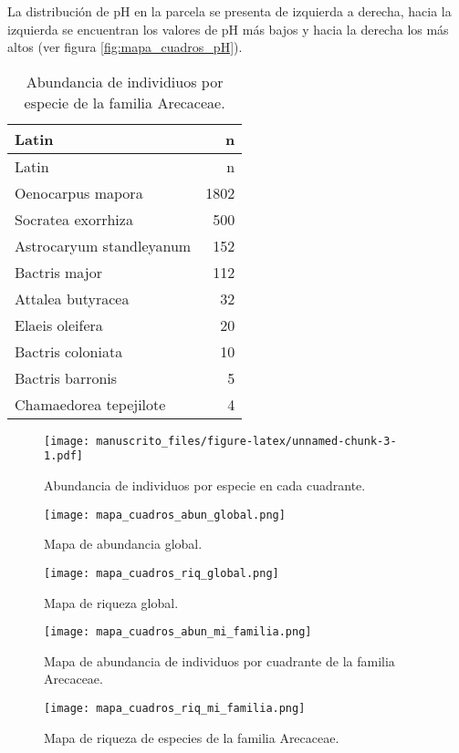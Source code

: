 \documentclass[11pt,]{article}
\begin{document}
La distribución de pH en la parcela se presenta de izquierda a derecha,
hacia la izquierda se encuentran los valores de pH más bajos y hacia la
derecha los más altos (ver figura \ref{fig:mapa_cuadros_pH}).

\begin{longtable}[]{@{}lr@{}}
\caption{\label{tab:abun_sp}Abundancia de individiuos por especie de la
familia Arecaceae.}\tabularnewline
\toprule
Latin & n\tabularnewline
\midrule
\endfirsthead
\toprule
Latin & n\tabularnewline
\midrule
\endhead
Oenocarpus mapora & 1802\tabularnewline
Socratea exorrhiza & 500\tabularnewline
Astrocaryum standleyanum & 152\tabularnewline
Bactris major & 112\tabularnewline
Attalea butyracea & 32\tabularnewline
Elaeis oleifera & 20\tabularnewline
Bactris coloniata & 10\tabularnewline
Bactris barronis & 5\tabularnewline
Chamaedorea tepejilote & 4\tabularnewline
\bottomrule
\end{longtable}

\begin{figure}
\centering
\texttt{[image: manuscrito\_files/figure-latex/unnamed-chunk-3-1.pdf]}
\caption{\label{fig:abun_sp_q}Abundancia de individuos por especie en
cada cuadrante.}
\end{figure}

\begin{figure}
\centering
\texttt{[image: mapa\_cuadros\_abun\_global.png]}
\caption{Mapa de abundancia global.
\label{fig:mapa_cuadros_abun_global}}
\end{figure}

\begin{figure}
\centering
\texttt{[image: mapa\_cuadros\_riq\_global.png]}
\caption{Mapa de riqueza global. \label{fig:mapa_cuadros_riq_global}}
\end{figure}

\begin{figure}
\centering
\texttt{[image: mapa\_cuadros\_abun\_mi\_familia.png]}
\caption{Mapa de abundancia de individuos por cuadrante de la familia
Arecaceae. \label{fig:mapa_cuadros_abun_mi_familia}}
\end{figure}

\begin{figure}
\centering
\texttt{[image: mapa\_cuadros\_riq\_mi\_familia.png]}
\caption{Mapa de riqueza de especies de la familia Arecaceae.
\label{fig:mapa_cuadros_riq_mi_familia}}
\end{figure}
\end{document}

